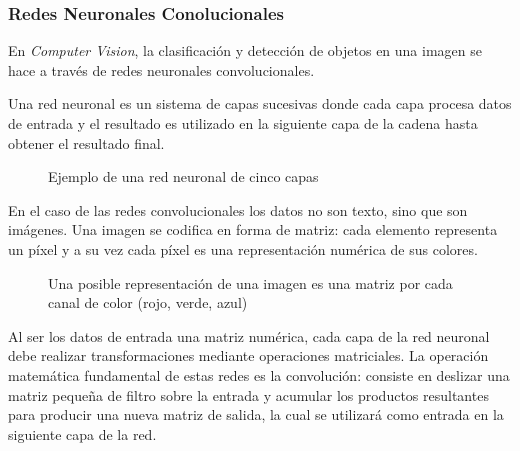 \documentclass[a4paper]{article}
\begin{document}
\subsubsection{Redes Neuronales Conolucionales}

En \textit{Computer Vision}, la clasificación y detección de objetos en una imagen se hace a través de redes neuronales convolucionales.

Una red neuronal es un sistema de capas sucesivas donde cada capa procesa datos de entrada y el resultado es utilizado en la siguiente capa de la cadena hasta obtener el resultado final.

\begin{figure}[H]
\caption{Ejemplo de una red neuronal de cinco capas}
\end{figure}


En el caso de las redes convolucionales los datos no son texto, sino que son imágenes.
Una imagen se codifica en forma de matriz: cada elemento representa un píxel y a su vez cada píxel es una representación numérica de sus colores.

\begin{figure}[H]
\caption{Una posible representación de una imagen es una matriz por cada canal de color (rojo, verde, azul)}
\end{figure}

Al ser los datos de entrada una matriz numérica, cada capa de la red neuronal debe realizar transformaciones mediante operaciones matriciales. La operación matemática fundamental de estas redes es la convolución: consiste en deslizar una matriz pequeña de filtro sobre la entrada y acumular los productos resultantes para producir una nueva matriz de salida, la cual se utilizará como entrada en la siguiente capa de la red.
\end{document}
